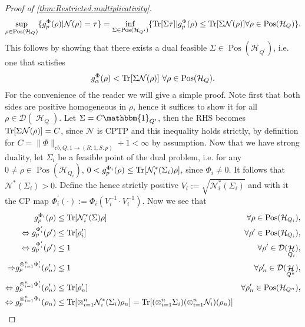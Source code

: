 \documentclass[11pt]{article}
\DeclareMathOperator{\Pos}{Pos}
\newcommand{\1}{\ensuremath{\mathbbm{1}}}
\theoremstyle{newdefinition}
\theoremstyle{newplain}
\theoremstyle{myplain}
\DeclareMathOperator{\cH}{\mathcal{H}}
\begin{document}
\begin{proof}[Proof of \cref{thm:Restricted.multiplicativity}]
\begin{align}\label{equ:Strong.Duality}
    \sup_{\rho\in\Pos(\mathcal{H}_Q)}\{g^\Phi_p(\rho)|\mathcal{N}(\rho)=\tau\} = \inf_{\Sigma\in\Pos(\mathcal{H}_{Q^\prime})}\{\Tr[\Sigma\tau]| g^\Phi_p(\rho)\leq \Tr[\Sigma\mathcal{N}(\rho)] \forall \rho\in\Pos(\mathcal{H}_Q)\}.
\end{align}
This follows by showing that there exists a dual feasible $\Sigma\in\Pos(\mathcal{H}_{Q^\prime})$, i.e. one that satisfies
\begin{align}
    g_\alpha^\Phi(\rho)<\Tr[\Sigma \mathcal{N}(\rho)] \ \forall \rho\in\Pos(\mathcal{H}_Q).
\end{align}
For the convenience of the reader we will give a simple proof. Note first that both sides are positive homogeneous in $\rho$, hence it suffices to show it for all $\rho\in\mathcal{D}(\cH_{Q})$. Let $\Sigma=C\1_{Q^\prime}$, then the RHS becomes $\Tr[\Sigma \mathcal{N}(\rho)]=C$, since $\mathcal{N}$ is CPTP and this inequality holds strictly, by definition for $C =\|\Phi\|_{cb,Q:1\to(R:1,S:p)} + 1<\infty$ by assumption. 
Now that we have strong duality, let $\Sigma_i$ be a feasible point of the dual problem, i.e.
for any $0\neq \rho\in\Pos(\mathcal{H}_{Q_i})$, $0<g_p^{\Phi_i}(\rho)\leq \Tr[\mathcal{N}^*_i(\Sigma_i)\rho]$, since $\Phi_i\neq 0$.
It follows that $\mathcal{N}^*(\Sigma_i) > 0$. Define the hence  strictly positive $V_i:=\sqrt{\mathcal{N}^*_i(\Sigma_i)}$ and with it the CP map $\Phi_i^\prime(\cdot):=\Phi_i(V_i^{-1}\cdot V_i^{-1})$. 
Now we see that
\begin{align}
g_p^{\Phi_i}(\rho) &\leq \Tr[\mathcal{N}^*_i(\Sigma)\rho] \quad &\forall \rho\in\Pos(\mathcal{H}_{Q_i}), \\ 
\Leftrightarrow  g_p^{\Phi^\prime_i}(\rho^\prime) &\leq  \Tr[\rho_i^\prime] \quad &\forall \rho^\prime \in \Pos(\mathcal{H}_{Q_i}), \\
\Leftrightarrow g_p^{\Phi^\prime_i}(\rho^\prime) &\leq 1 &\forall \rho^\prime\in\mathcal{D}(\cH_{Q_i}), \\
{\Rightarrow} g_p^{\otimes_{i=1}^n\Phi^\prime_i}(\rho_n^\prime) &\leq 1 \quad &\forall \rho_n^\prime\in \mathcal{D}(\cH_{Q^n}), \\ 
\Leftrightarrow g_p^{\otimes_{i=1}^n\Phi^\prime_i}(\rho_n^\prime) &\leq \Tr[\rho_n^\prime] \quad &\forall \rho_n^\prime\in\Pos(\mathcal{H}_{Q^n}), \\
\Leftrightarrow g_p^{\otimes_{i=1}^n\Phi_i}(\rho_n) &\leq \Tr[\otimes^n_{i=1}\mathcal{N}^*_i(\Sigma_i)\rho_n] = \Tr[(\otimes_{i=1}^n\Sigma_i)(\otimes_{i=1}^n\mathcal{N}_i)(\rho_n)] 

\end{align}
\end{proof}
\end{document}
